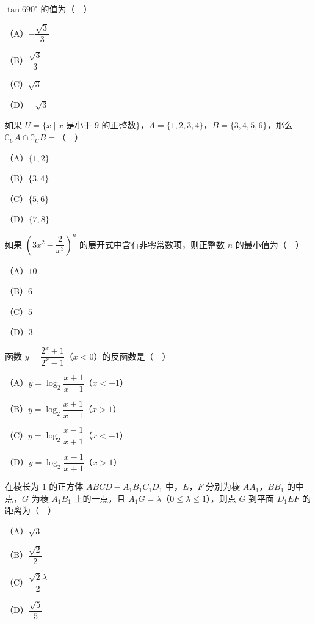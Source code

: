


\begin{question}
$\tan690^\circ$ 的值为（　）

（A）$-\dfrac{\sqrt3}{3}$

（B）$\dfrac{\sqrt3}{3}$

（C）$\sqrt3$

（D）$-\sqrt3$

\end{question}
\begin{question}
如果 $U=\{x\mid x$ 是小于 $9$ 的正整数$\}$，$A=\{1,2,3,4\}$，$B=\{3,4,5,6\}$，那么 $\complement_UA\cap\complement_UB=$（　）

（A）$\{1,2\}$

（B）$\{3,4\}$

（C）$\{5,6\}$

（D）$\{7,8\}$

\end{question}
\begin{question}
如果 $\left(3x^2-\dfrac{2}{x^3}\right)^n$ 的展开式中含有非零常数项，则正整数 $n$ 的最小值为（　）

（A）$10$

（B）$6$

（C）$5$

（D）$3$

\end{question}
\begin{question}
函数 $y=\dfrac{2^x+1}{2^x-1}$（$x<0$）的反函数是（　）

（A）$y=\log_2\dfrac{x+1}{x-1}$（$x<-1$）

（B）$y=\log_2\dfrac{x+1}{x-1}$（$x>1$）

（C）$y=\log_2\dfrac{x-1}{x+1}$（$x<-1$）

（D）$y=\log_2\dfrac{x-1}{x+1}$（$x>1$）

\Needspace{0.4\textheight}
\end{question}
\begin{question}
在棱长为 $1$ 的正方体 $ABCD-A_1B_1C_1D_1$ 中，$E$，$F$ 分别为棱 $AA_1$，$BB_1$ 的中点，$G$ 为棱 $A_1B_1$ 上的一点，且 $A_1G=\lambda$（$0\leqslant\lambda\leqslant1$），则点 $G$ 到平面 $D_1EF$ 的距离为（　）
\nopagebreak[4]
\begin{center}\end{center}
\nopagebreak[4]
（A）$\sqrt3$

（B）$\dfrac{\sqrt2}{2}$

（C）$\dfrac{\sqrt2\lambda}{2}$

（D）$\dfrac{\sqrt5}{5}$

\Needspace{0.4\textheight}
\end{question}
